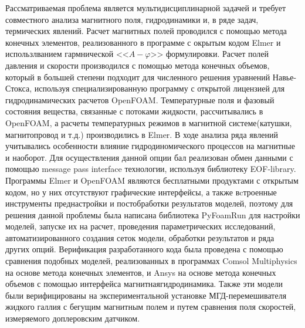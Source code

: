{\methods} Рассматриваемая проблема является мультидисциплинарной задачей и требует совместного анализа магнитного поля, гидродинамики и, в ряде задач, термических явлений. Расчет магнитных полей  проводился с помощью метода конечных элементов, реализованного в  программе с окрытым кодом Elmer и использлванием гармнической <<$A-\varphi$>> формулировки. Расчет полей давления и скорости производился с  помощью метода конечных объемов, который в большей степени подходит для численного решения уравнений Навье-Стокса, используя специализированную программу с открытой лицензией для гидродинамических расчетов OpenFOAM. Температурные поля и фазовый состояния вещества, связанные с потоками жидкости, рассчитывались в OpenFOAM, а расчеты температурных режимов в магнитной системе(катушки, магнитопровод и т.д.) производились в Elmer. В ходе анализа ряда явлений учитывались особенности влияние гидродиномического процессов на магнитные и наоборот. Для осуществления данной опции бал реализован обмен данными с помощью message pass interface технологии, используя библиотеку EOF-library. Программы Elmer и OpenFOAM являются бесплатными продуктами с открытым кодом, но у них отсутствуют графические интерфейсы, а также вcтроенные инструменты преднастройки и постобработки результатов моделей, поэтому для решения данной проблемы была написана библиотека PyFoamRun для настройки моделей, запуске их на расчет, проведения параметрических исследований, автоматизированного создания сеток модели, обработки результатов и ряда других опций. Верификация разработанного кода была проведена с помощью сравнения подобных моделей, реализованных в программах Comsol Multiphysics на основе метода конечных элементов, и Ansys на основе метода конечных объемов с помощью интерфейса магнитнаягидродинамика. Также эти модели были верифицированы на экспериментальной установке МГД-перемешивателя жидкого галлия с бегущим магнитным полем и путем сравнения поля скоростей, измеряемого доплеровским датчиком. 



